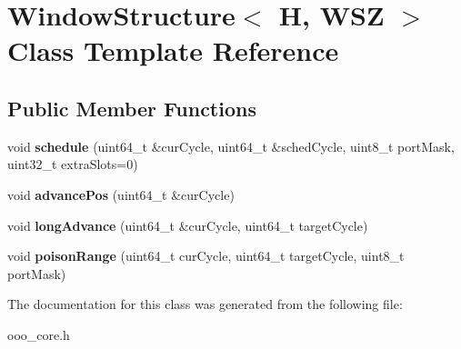 \hypertarget{classWindowStructure}{\section{Window\-Structure$<$ H, W\-S\-Z $>$ Class Template Reference}
\label{classWindowStructure}
}
\subsection*{Public Member Functions}
\begin{DoxyCompactItemize}
\item 
\hypertarget{classWindowStructure_a5fbb851ff77e797c76e76516733a249c}{void {\bfseries schedule} (uint64\-\_\-t \&cur\-Cycle, uint64\-\_\-t \&sched\-Cycle, uint8\-\_\-t port\-Mask, uint32\-\_\-t extra\-Slots=0)}\label{classWindowStructure_a5fbb851ff77e797c76e76516733a249c}

\item 
\hypertarget{classWindowStructure_ac5f7ce8a6a107ea5fca4038add8d2a48}{void {\bfseries advance\-Pos} (uint64\-\_\-t \&cur\-Cycle)}\label{classWindowStructure_ac5f7ce8a6a107ea5fca4038add8d2a48}

\item 
\hypertarget{classWindowStructure_a1cc12f308688ba1fdf56d53b6b60237f}{void {\bfseries long\-Advance} (uint64\-\_\-t \&cur\-Cycle, uint64\-\_\-t target\-Cycle)}\label{classWindowStructure_a1cc12f308688ba1fdf56d53b6b60237f}

\item 
\hypertarget{classWindowStructure_a9ac13aa6980ecce3bc1eb1de86fe57b7}{void {\bfseries poison\-Range} (uint64\-\_\-t cur\-Cycle, uint64\-\_\-t target\-Cycle, uint8\-\_\-t port\-Mask)}\label{classWindowStructure_a9ac13aa6980ecce3bc1eb1de86fe57b7}

\end{DoxyCompactItemize}


The documentation for this class was generated from the following file\-:\begin{DoxyCompactItemize}
\item 
ooo\-\_\-core.\-h\end{DoxyCompactItemize}
